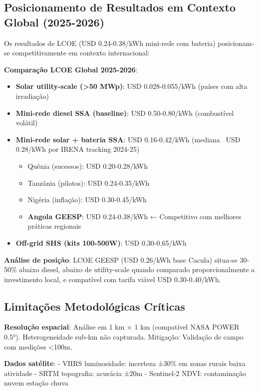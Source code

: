 \documentclass[12pt, a4paper]{article}
\begin{document}
{{{{{{{{{{{{{\subsection{Posicionamento de Resultados em Contexto Global (2025-2026)}

Os resultados de LCOE (USD 0.24-0.38/kWh mini-rede com bateria) posicionam-se competitivamente em contexto internacional:

\textbf{Comparação LCOE Global 2025-2026}:

\begin{itemize}
  \item \textbf{Solar utility-scale (>50 MWp)}: USD 0.028-0.055/kWh (países com alta irradiação)
  \item \textbf{Mini-rede diesel SSA (baseline)}: USD 0.50-0.80/kWh (combustível volátil)
  \item \textbf{Mini-rede solar + bateria SSA}: USD 0.16-0.42/kWh (mediana ~USD 0.28/kWh por IRENA tracking 2024-25)
  \begin{itemize}
    \item Quênia (sucessos): USD 0.20-0.28/kWh
    \item Tanzânia (pilotos): USD 0.24-0.35/kWh
    \item Nigéria (inflação): USD 0.30-0.45/kWh
    \item \textbf{Angola GEESP}: USD 0.24-0.38/kWh ← Competitivo com melhores práticas regionais
  \end{itemize}
  \item \textbf{Off-grid SHS (kits 100-500W)}: USD 0.30-0.65/kWh
\end{itemize}

\textbf{Análise de posição}: LCOE GEESP (USD 0.26/kWh base Cacula) situa-se 30-50\% abaixo diesel, abaixo de utility-scale quando comparado proporcionalmente a investimento local, e compatível com tarifa viável USD 0.30-0.40/kWh.

\subsection{Limitações Metodológicas Críticas}

\textbf{Resolução espacial}: Análise em 1 km × 1 km (compatível NASA POWER 0.5°). Heterogeneidade sub-km não capturada. Mitigação: Validação de campo com medições <100m.

\textbf{Dados satélite}: 
- VIIRS luminosidade: incerteza ±30\% em zonas rurais baixa atividade
- SRTM topografia: acurácia ±20m
- Sentinel-2 NDVI: contaminação nuvem estação chuva

}}}}}}}}}}}}}
\end{document}
